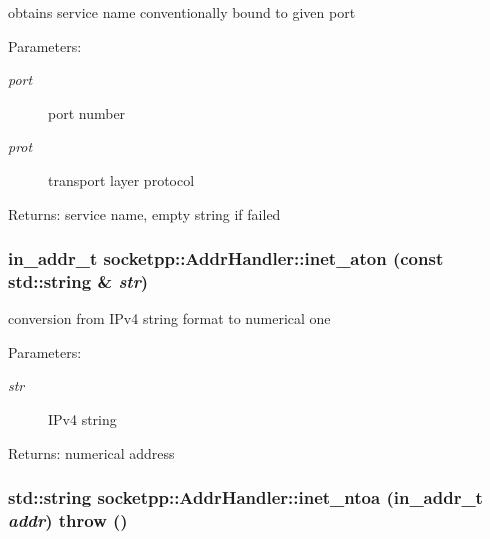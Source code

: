 obtains service name conventionally bound to given port 

\begin{Desc}
\item[Parameters:]
\begin{description}
\item[{\em port}]port number \item[{\em prot}]transport layer protocol \end{description}
\end{Desc}
\begin{Desc}
\item[Returns:]service name, empty string if failed \end{Desc}
\hypertarget{classsocketpp_1_1AddrHandler_e2eda37cd4c20059c557e4e65c829cf8}{
\subsubsection[{inet\_\-aton}]{\setlength{\rightskip}{0pt plus 5cm}in\_\-addr\_\-t socketpp::AddrHandler::inet\_\-aton (const std::string \& {\em str})}}
\label{classsocketpp_1_1AddrHandler_e2eda37cd4c20059c557e4e65c829cf8}


conversion from IPv4 string format to numerical one 

\begin{Desc}
\item[Parameters:]
\begin{description}
\item[{\em str}]IPv4 string \end{description}
\end{Desc}
\begin{Desc}
\item[Returns:]numerical address \end{Desc}
\hypertarget{classsocketpp_1_1AddrHandler_a4377d84c8ea976aeada2b2eb0ac248d}{
\subsubsection[{inet\_\-ntoa}]{\setlength{\rightskip}{0pt plus 5cm}std::string socketpp::AddrHandler::inet\_\-ntoa (in\_\-addr\_\-t {\em addr})  throw ()}}
\label{classsocketpp_1_1AddrHandler_a4377d84c8ea976aeada2b2eb0ac248d}


